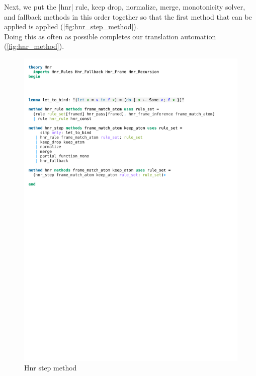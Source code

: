 \noindent Next, we put the |hnr| rule, keep drop, normalize, merge, monotonicity solver, and fallback methods in this order together so that the first method that can be applied is applied (\autoref{fig:hnr_step_method}).\\
Doing this as often as possible completes our translation automation (\autoref{fig:hnr_method}).

\begin{figure}[htpb]
    \includegraphics[trim={0 19,2cm 0 6,6cm}, clip, width=1.00\textwidth]{figures/Theory_Hnr.pdf}
    \caption[Hnr step method]{Hnr step method}
    \label{fig:hnr_step_method}
\end{figure}

